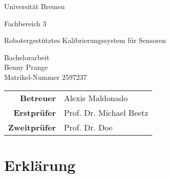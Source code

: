 
\pagestyle{empty} %

\clearscrheadings\clearscrplain
\begin{center}
\begin{Huge}
Universität Bremen\\
\vspace{3mm}
\end{Huge}
{\Large Fachbereich 3}\\

\vspace{20mm}
\begin{Large}
Robotergestütztes Kalibrierungssystem für Sensoren\\
\end{Large}
\vspace{8mm}
Bachelorarbeit\\
\vspace{0.4cm}
\vspace{2 cm}
Benny Prange \\
Matrikel-Nummer 2597237\\
\vspace{8cm}
\begin{tabular}{rl}
{\bfseries Betreuer} & Alexis Maldonado\\
{\bfseries Erstprüfer}&Prof. Dr. Michael Beetz\\
{\bfseries Zweitprüfer}&Prof. Dr. Doe\\
\end{tabular}

\end{center}
\clearpage


\pagestyle{useheadings} %

\tableofcontents %
\listoffigures %
\listoftables %
\clearpage









\chapter*{Erklärung}

